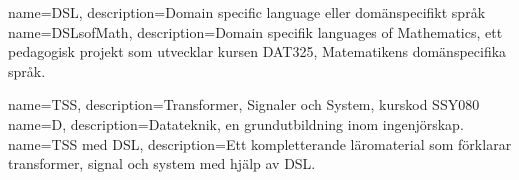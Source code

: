 {
    name=DSL,
    description={Domain specific language eller domänspecifikt språk}
}
{
    name=DSLsofMath,
    description={Domain specifik languages of Mathematics, ett pedagogisk projekt som utvecklar kursen DAT325, Matematikens domänspecifika språk.}
}

{
    name=TSS,
    description={Transformer, Signaler och System, kurskod SSY080}
}
{
    name=D,
    description={Datateknik, en grundutbildning inom ingenjörskap.}
}
{
    name=TSS med DSL,
    description={Ett kompletterande läromaterial som förklarar transformer, signal och system med hjälp av DSL.}
}